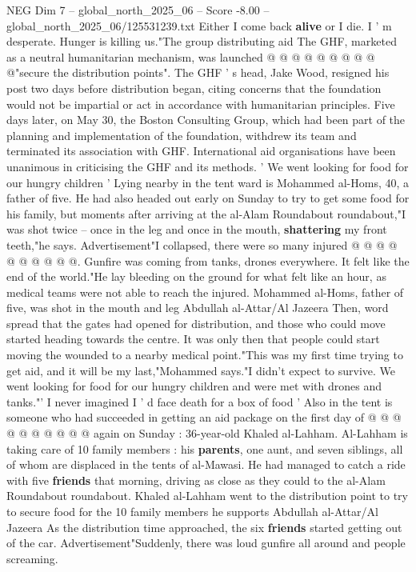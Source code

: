 \begin{textsample}{NEG Dim 7 – global\_north\_2025\_06 – Score -8.00 – global\_north\_2025\_06/125531239.txt}
Either I come back \textbf{alive} or I die.
I ' m desperate.
Hunger is killing us."The group distributing aid The GHF, marketed as a neutral humanitarian mechanism, was launched @ @ @ @ @ @ @ @ @ @"secure the distribution points".
The GHF ' s head, Jake Wood, resigned his post two days before distribution began, citing concerns that the foundation would not be impartial or act in accordance with humanitarian principles.
Five days later, on May 30, the Boston Consulting Group, which had been part of the planning and implementation of the foundation, withdrew its team and terminated its association with GHF.
International aid organisations have been unanimous in criticising the GHF and its methods. ' We went looking for food for our hungry children ' Lying nearby in the tent ward is Mohammed al-Homs, 40, a father of five.
He had also headed out early on Sunday to try to get some food for his family, but moments after arriving at the al-Alam Roundabout roundabout,"I was shot twice -- once in the leg and once in the mouth, \textbf{shattering} my front teeth,"he says.
Advertisement"I collapsed, there were so many injured @ @ @ @ @ @ @ @ @ @.
Gunfire was coming from tanks, drones everywhere.
It felt like the end of the world."He lay bleeding on the ground for what felt like an hour, as medical teams were not able to reach the injured.
Mohammed al-Homs, father of five, was shot in the mouth and leg Abdullah al-Attar/Al Jazeera Then, word spread that the gates had opened for distribution, and those who could move started heading towards the centre.
It was only then that people could start moving the wounded to a nearby medical point."This was my first time trying to get aid, and it will be my last,"Mohammed says."I didn't expect to survive.
We went looking for food for our hungry children and were met with drones and tanks."' I never imagined I ' d face death for a box of food ' Also in the tent is someone who had succeeded in getting an aid package on the first day of @ @ @ @ @ @ @ @ @ @ again on Sunday : 36-year-old Khaled al-Lahham.
Al-Lahham is taking care of 10 family members : his \textbf{parents}, one aunt, and seven siblings, all of whom are displaced in the tents of al-Mawasi.
He had managed to catch a ride with five \textbf{friends} that morning, driving as close as they could to the al-Alam Roundabout roundabout.
Khaled al-Lahham went to the distribution point to try to secure food for the 10 family members he supports Abdullah al-Attar/Al Jazeera As the distribution time approached, the six \textbf{friends} started getting out of the car.
Advertisement"Suddenly, there was loud gunfire all around and people screaming.

\end{textsample}
